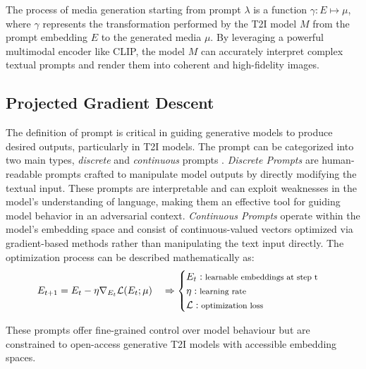 \documentclass[acmsmall]{acmart}
\begin{document}
The process of media generation starting from prompt $\lambda$ is a function $\gamma: E \mapsto \mu$, where $\gamma$ represents the transformation performed by the T2I model $M$ from the prompt embedding $E$ to the generated media $\mu$. By leveraging a powerful multimodal encoder like CLIP, the model $M$ can accurately interpret complex textual prompts and render them into coherent and high-fidelity images.
\vspace{-0.2cm}
\subsection{Projected Gradient Descent}\label{subsec:pgd}
The definition of prompt is critical in guiding generative models to produce desired outputs, particularly in T2I models. The prompt can be categorized into two main types, \textit{discrete} and \textit{continuous} prompts \cite{liu2023pre}. 
\textit{Discrete Prompts} are human-readable prompts crafted to manipulate model outputs by directly modifying the textual input. These prompts are interpretable and can exploit weaknesses in the model's understanding of language, making them an effective tool for guiding model behavior in an adversarial context. \textit{Continuous Prompts} operate within the model's embedding space and consist of continuous-valued vectors optimized via gradient-based methods rather than manipulating the text input directly.
The optimization process can be described mathematically as:
\begin{equation}
E_{t+1} = E_t - \eta \nabla_{E_t} \mathcal{L}(E_t; \mu)\quad \Rightarrow
\begin{cases}
{E_t}:\text{{\footnotesize learnable embeddings at step t}} \\
  \eta:\text{{\footnotesize learning rate}} \\
\mathcal{L}:\text{{\footnotesize optimization loss}}
\end{cases}
\label{eq:embedding_update}
\end{equation}

These prompts offer fine-grained control over model behaviour but are constrained to open-access generative T2I models with accessible embedding spaces.
\end{document}
